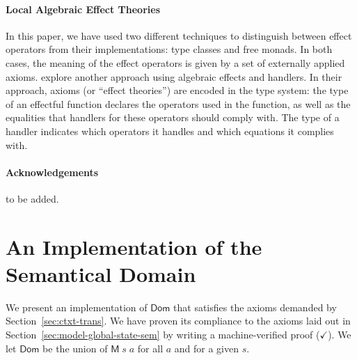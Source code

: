 \documentclass{llncs}
\newcommand{\Conid}[1]{\mathit{#1}}
\newcommand{\Varid}[1]{\mathit{#1}}
\let\Varid\mathit
\let\Conid\mathsf
\begin{document}
\paragraph{Local Algebraic Effect Theories}
In this paper, we have used two different techniques to distinguish between
effect operators from their implementations: type classes and free monads. In
both cases, the meaning of the effect operators is given by a set of externally
applied axioms.
\cite{Pretnar:19} explore another approach using algebraic
effects and handlers.
In their approach, axioms (or ``effect theories'') are encoded in the type
system: the type of an effectful function declares the operators used in the
function, as well as the equalities that handlers for these operators
should comply with.
The type of a handler indicates which operators it handles and which equations
it complies with.



\paragraph{Acknowledgements} to be added.




%

\appendix

\pagebreak
\section{An Implementation of the Semantical Domain}
\label{sec:GSMonad}

We present an implementation of \ensuremath{\Conid{Dom}} that satisfies the
axioms demanded by Section~\ref{sec:ctxt-trans}.
We have proven its compliance to the axioms laid out in
Section~\ref{sec:model-global-state-sem} by writing a machine-verified proof
($\checkmark$).
We let \ensuremath{\Conid{Dom}} be the union of \ensuremath{\Conid{M}\;\Varid{s}\;\Varid{a}} for all \ensuremath{\Varid{a}} and
for a given \ensuremath{\Varid{s}}.
\end{document}
